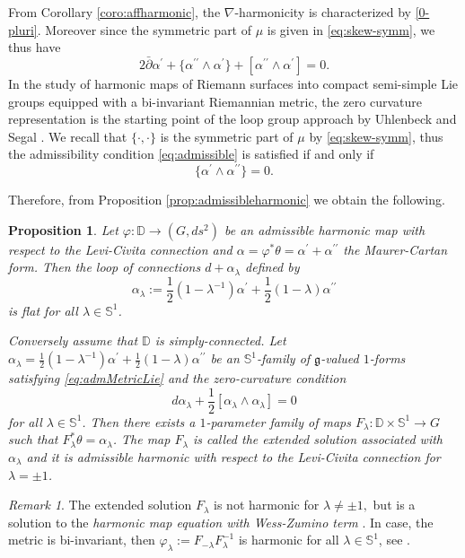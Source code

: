 \documentclass[12pt]{amsart}
\newtheorem{Proposition}[Theorem]{Proposition}
\theoremstyle{definition}
\theoremstyle{remark}
\newtheorem{Remark}[Theorem]{Remark}
\numberwithin{equation}{section}
\begin{document}
 From Corollary \ref{coro:affharmonic}, the $\nabla$-harmonicity is characterized 
 by \eqref{0-pluri}. Moreover since 
 the symmetric part of $\mu$ is given in \eqref{eq:skew-symm}, we thus have 
\begin{equation}\label{harm+integ}
  2 \bar \partial \alpha^{\prime } + \{\alpha^{\prime \prime}\wedge 
 \alpha^{\prime}\} + [\alpha^{\prime \prime} \wedge \alpha^{\prime}]=0.
\end{equation}
 In the study of harmonic maps of Riemann surfaces into 
 compact semi-simple Lie groups equipped with a
 bi-invariant Riemannian metric, the zero curvature representation is 
 the starting point of the loop group approach 
 by Uhlenbeck \cite{Uhlenbeck} and Segal \cite{Segal}.
 We recall that $\{\cdot,\cdot\}$
 is the symmetric part of $\mu$ by \eqref{eq:skew-symm}, 
 thus  the admissibility condition \eqref{eq:admissible} is satisfied  if and only if 
 \begin{equation}\label{eq:admMetricLie}
 \{ \alpha^{\prime} \wedge \alpha^{\prime \prime}\} =0.
 \end{equation}

 Therefore, from Proposition \ref{prop:admissibleharmonic} 
 we obtain the following.
 \begin{Proposition}\label{ZCRforG}
 Let $\varphi:\mathbb{D}\to (G, ds^2)$ be 
 an admissible harmonic map with respect 
 to the Levi-Civita connection 
 and $\alpha = \varphi^{*}\theta = 
 \alpha^{\prime} + \alpha^{\prime \prime}$ the Maurer-Cartan 
 form. 
 Then the loop of connections $d+\alpha_{\lambda}$ defined by
\begin{equation}
 \alpha_{\lambda}:=
 \frac{1}{2}(1-\lambda^{-1})\alpha^{\prime}+
 \frac{1}{2}(1-\lambda)\alpha^{\prime \prime}
\end{equation}
 is flat for all $\lambda \in \mathbb S^1$. 

 Conversely assume that 
 $\mathbb{D}$ is simply-connected. Let $\alpha_{\lambda}=
 \frac{1}{2}(1-\lambda^{-1})\alpha^{\prime}+
 \frac{1}{2}(1-\lambda)\alpha^{\prime \prime}$ 
 be an $\mathbb{S}^1$-family of $\mathfrak{g}$-valued 
 $1$-forms satisfying \eqref{eq:admMetricLie} and 
 the zero-curvature condition
\begin{equation*}
 d\alpha_{\lambda}+\frac{1}{2}[\alpha_\lambda\wedge \alpha_\lambda]=0
\end{equation*}
 for all $\lambda \in \mathbb{S}^1$.
 Then there exists a $1$-parameter family of maps $F_\lambda:
 \mathbb{D}\times \mathbb{S}^1\to G$ such that 
 $F_{\lambda}^{*}\theta=\alpha_{\lambda}$. 
 The map $F_{\lambda}$ is called the extended solution associated with 
 $\alpha_\lambda$ and 
 it is admissible harmonic with respect to the Levi-Civita connection 
 for $\lambda=\pm 1$. 
\end{Proposition}
\begin{Remark}
 The extended solution 
 $F_{\lambda}$ is not harmonic for $\lambda\not=\pm 1,$ but 
 is a solution to the \textit{harmonic map equation with Wess-Zumino term}
 \cite{Hitchin2, Khemar, Tyrin}. 
 In case, the metric is bi-invariant, then 
 $\varphi_{\lambda}:=F_{-\lambda}F_{\lambda}^{-1}$ is harmonic 
 for all $\lambda\in \mathbb{S}^1$, see \cite{DE}.  
\end{Remark}
\end{document}
